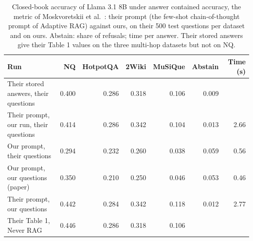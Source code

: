 \begin{table}[t]
\centering\small
\setlength{\tabcolsep}{4pt}
\caption{Closed-book accuracy of Llama 3.1 8B under answer contained accuracy, the metric of Moskvoretskii et al.~\cite{moskvoretskii2025adaptive}: their prompt (the few-shot chain-of-thought prompt of Adaptive RAG) against ours, on their 500 test questions per dataset and on ours. Abstain: share of refusals; time per answer. Their stored answers give their Table 1 values on the three multi-hop datasets but not on NQ.}
\label{tab:rev2_closedbook}
\begin{tabular*}{\linewidth}{@{\extracolsep{\fill}}lrrrrrr}
\toprule
Run & NQ & HotpotQA & 2Wiki & MuSiQue & Abstain & Time (s) \\
\midrule
Their stored answers, their questions & 0.400 & 0.286 & 0.318 & 0.106 & 0.009 &  \\
Their prompt, our run, their questions & 0.414 & 0.286 & 0.342 & 0.104 & 0.013 & 2.66 \\
Our prompt, their questions & 0.294 & 0.232 & 0.260 & 0.038 & 0.059 & 0.56 \\
Our prompt, our questions (paper) & 0.350 & 0.210 & 0.250 & 0.046 & 0.053 & 0.46 \\
Their prompt, our questions & 0.442 & 0.284 & 0.342 & 0.118 & 0.012 & 2.77 \\
Their Table 1, Never RAG & 0.446 & 0.286 & 0.318 & 0.106 &  &  \\
\bottomrule
\end{tabular*}
\end{table}
